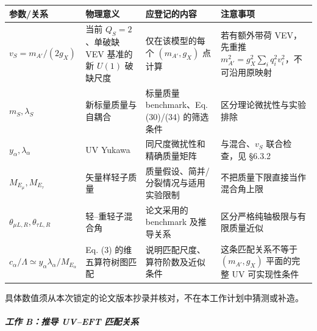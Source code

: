 \documentclass[
  chinese,
  UTF8]{ctexart}
\newcounter{none} %
\begin{document}
{\def\LTcaptype{none} %
\begin{longtable}[]{@{}
  >{\raggedright\arraybackslash}p{}
  >{\raggedright\arraybackslash}p{}
  >{\raggedright\arraybackslash}p{}
  >{\raggedright\arraybackslash}p{}@{}}
\toprule\noalign{}
\begin{minipage}[b]{\linewidth}\raggedright
参数/关系
\end{minipage} & \begin{minipage}[b]{\linewidth}\raggedright
物理意义
\end{minipage} & \begin{minipage}[b]{\linewidth}\raggedright
应登记的内容
\end{minipage} & \begin{minipage}[b]{\linewidth}\raggedright
注意事项
\end{minipage} \\
\midrule\noalign{}
\endhead
\bottomrule\noalign{}
\endlastfoot
\(v_S=m_{A'}/(2g_X)\) & 当前 \(Q_S=2\)、单破缺 VEV 基准的新 \(U(1)\)
破缺尺度 & 仅在该模型的每个 \((m_{A'},g_X)\) 点计算 & 若有额外带荷
VEV，先重推 \(m_{A'}^2=g_X^2\sum_i q_i^2v_i^2\)，不可沿用原映射 \\
\(m_S,\lambda_S\) & 新标量质量与自耦合 & 标量质量 benchmark、Eq.
(30)/(34) 的筛选条件 & 区分理论微扰性与实验排除 \\
\(y_\alpha,\lambda_\alpha\) & UV Yukawa & 同尺度微扰性和精确质量矩阵 &
与混合、\(v_S\) 联合检查，见 §6.3.2 \\
\(M_{E_\mu},M_{E_\tau}\) & 矢量样轻子质量 &
质量假设、简并/分裂情况与适用实验限制 &
不把质量下限直接当作混合角上限 \\
\(\theta_{\mu L,R},\theta_{\tau L,R}\) & 轻--重轻子混合角 & 论文采用的
benchmark 及推导关系 & 区分严格纯轴极限与有限质量近似 \\
\(c_\alpha/\Lambda\simeq y_\alpha\lambda_\alpha/M_{E_\alpha}\) & Eq. (3)
的维五算符树图匹配 & 说明匹配尺度、算符阶数及近似条件 &
这条匹配关系不等于 \((m_{A'},g_X)\) 平面的完整 UV 可实现性条件 \\
\end{longtable}
}

具体数值须从本次锁定的论文版本抄录并核对，不在本工作计划中猜测或补造。

\subparagraph{工作 B：推导 UV--EFT
匹配关系}\label{ux5de5ux4f5c-bux63a8ux5bfc-uveft-ux5339ux914dux5173ux7cfb}
\end{document}
